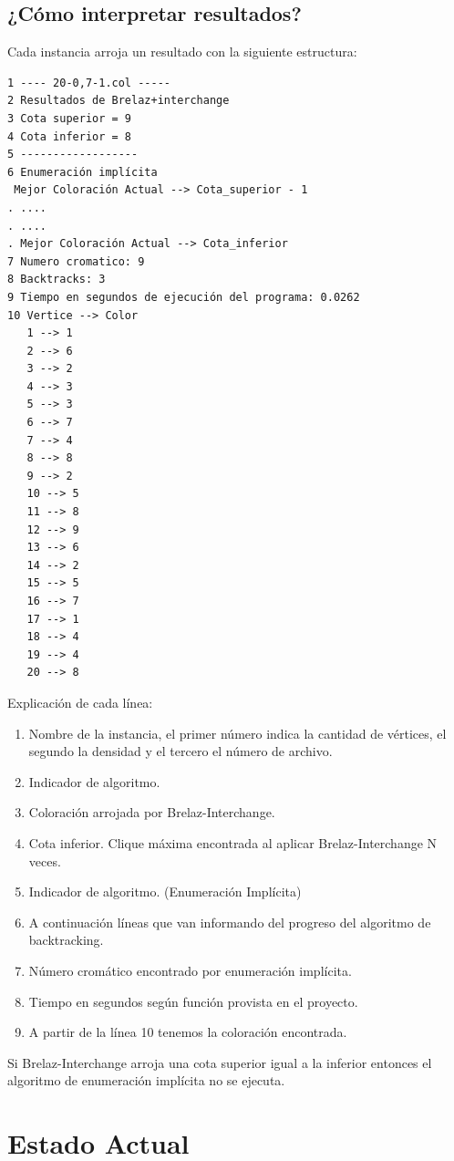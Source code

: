 \documentclass[a4paper,10pt]{article}
\begin{document}
\subsection{¿Cómo interpretar resultados?}
Cada instancia arroja un resultado con la siguiente estructura:
\begin{verbatim}
1 ---- 20-0,7-1.col -----
2 Resultados de Brelaz+interchange 
3 Cota superior = 9                
4 Cota inferior = 8                
5 ------------------               
6 Enumeración implícita            
 Mejor Coloración Actual --> Cota_superior - 1
. ....
. ....
. Mejor Coloración Actual --> Cota_inferior
7 Numero cromatico: 9              
8 Backtracks: 3                    
9 Tiempo en segundos de ejecución del programa: 0.0262
10 Vertice --> Color                
   1 --> 1                          
   2 --> 6                          
   3 --> 2                          
   4 --> 3                          
   5 --> 3                          
   6 --> 7                          
   7 --> 4
   8 --> 8
   9 --> 2
   10 --> 5
   11 --> 8
   12 --> 9
   13 --> 6
   14 --> 2 
   15 --> 5
   16 --> 7
   17 --> 1
   18 --> 4
   19 --> 4
   20 --> 8
\end{verbatim}
Explicación de cada línea:
\begin{enumerate}
 \item Nombre de la instancia, el primer número indica la cantidad de vértices, el segundo la densidad y el tercero el número de archivo.
 \item Indicador de algoritmo.
 \item Coloración arrojada por Brelaz-Interchange.
 \item Cota inferior. Clique máxima encontrada al aplicar Brelaz-Interchange N veces.
 \item Indicador de algoritmo. (Enumeración Implícita)
 \item A continuación líneas que van informando del progreso del
       algoritmo de backtracking.
 \item Número cromático encontrado por enumeración implícita.
 \item Tiempo en segundos según función provista en el proyecto.
 \item A partir de la l\'inea 10 tenemos la coloraci\'on encontrada.
\end{enumerate}
Si Brelaz-Interchange arroja una cota superior igual a la inferior
entonces el algoritmo de enumeración implícita no se ejecuta.

\section{Estado Actual}
\end{document}
